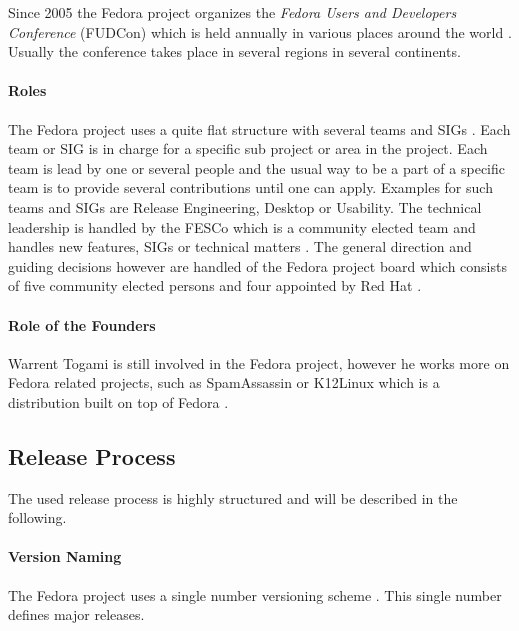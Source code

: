 Since 2005 the Fedora project organizes the \emph{Fedora Users and Developers
Conference} (FUDCon) which is held annually in various places around the world
\cite{FedoraFUDCon}. Usually the conference takes place in several regions in
several continents.

\paragraph{Roles}

The Fedora project uses a quite flat structure with several teams and \acp{SIG}
\cite{FedoraJoin,FedoraCommunicating,FedoraSIG}. Each team or \ac{SIG} is in
charge for a specific sub project or area in the project. Each team is lead by
one or several people and the usual way to be a part of a specific team is to
provide several contributions until one can apply. Examples for such teams and
\acp{SIG} are Release Engineering, Desktop or Usability. The technical
leadership is handled by the \ac{FESCo} which is a community elected team and
handles new features, \acp{SIG} or technical matters \cite{FedoraFESCo}. The
general direction and guiding decisions however are handled of the Fedora
project board which consists of five community elected persons and four
appointed by Red Hat \cite{FedoraBoard}.

\paragraph{Role of the Founders}

Warrent Togami is still involved in the Fedora project, however he works more
on Fedora related projects, such as SpamAssassin or K12Linux which is a
distribution built on top of Fedora \cite{FedoraTogami}.

\subsection{Release Process}

The used release process is highly structured and will be described in the
following.

\paragraph{Version Naming}

The Fedora project uses a single number versioning scheme
\cite{FedoraHistoricalSchedules,FedoraLifeCycle}. This single number defines
major releases.

